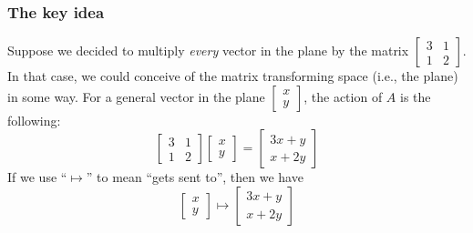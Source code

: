 \documentclass[10pt]{article}
\theoremstyle{definition}
\begin{document}
\subsubsection*{The key idea}
Suppose we decided to multiply \textit{every} vector in the plane by the
matrix $\begin{bmatrix}
  3&1\\
  1&2
\end{bmatrix}$. In that case, we could conceive of the matrix transforming
space (i.e., the plane) in some way. For a general vector in the plane $\begin{bmatrix} x\\y
\end{bmatrix}$, the action of $A$ is the following:
\begin{equation*}
  \begin{bmatrix}
    3&1\\
    1&2
  \end{bmatrix}
  \begin{bmatrix}
    x\\y
  \end{bmatrix}
  =
  \begin{bmatrix}
    3x+y\\
    x+2y
  \end{bmatrix}
\end{equation*}
If we use  ``$\mapsto$'' to mean ``gets sent to'', then we have
\begin{equation*}
  \begin{bmatrix}
    x\\y
  \end{bmatrix}
  \mapsto
  \begin{bmatrix}
    3x+y\\
    x+2y
  \end{bmatrix}
\end{equation*}
\end{document}
